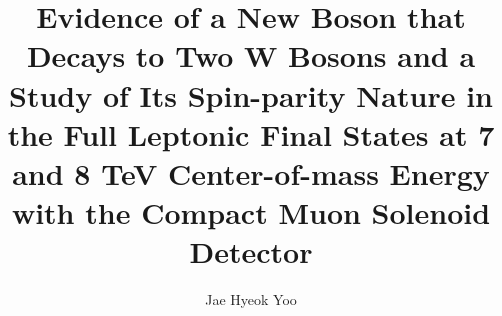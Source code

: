 %
%
%
%



\title{
Evidence of a New Boson that Decays to Two W Bosons 
and a Study of Its Spin-parity Nature 
in the Full Leptonic Final States 
at 7 and 8 TeV Center-of-mass Energy 
with the Compact Muon Solenoid Detector
}
\author{Jae Hyeok Yoo}


%




